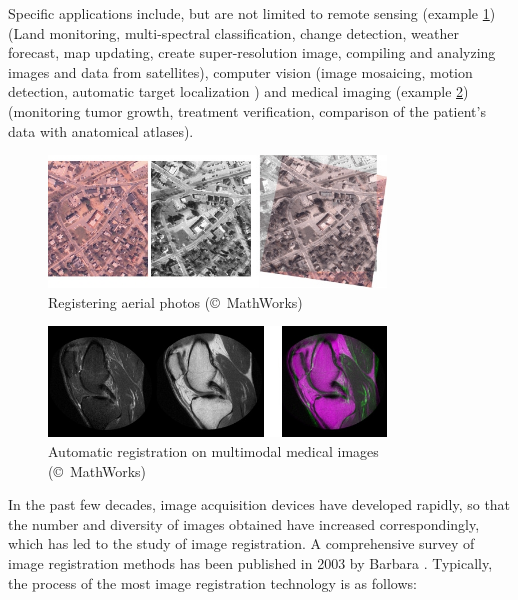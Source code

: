 Specific applications include, but are not limited to remote sensing (example \cref{fig:image registration example}) (Land monitoring, multi-spectral classification, change detection,  weather forecast, map updating, create super-resolution image, compiling and analyzing images and data from satellites), computer vision (image mosaicing, motion detection, automatic target localization )  and medical imaging (example \cref{fig:image registration example 2}) (monitoring tumor growth, treatment verification, comparison of the patient’s data with anatomical atlases).
\begin{figure}[htbp]
	\centering
	\includegraphics[width=0.80\textwidth]{images/Registering_aerial_photos}
	\caption{Registering aerial photos (\copyright\ MathWorks)}
	\label{fig:image registration example}
\end{figure}
\begin{figure}[htbp]
	\centering
	\includegraphics[width=0.80\textwidth]{images/medical_image}
	\caption{Automatic registration on multimodal medical images (\copyright\ MathWorks)}
	\label{fig:image registration example 2}
\end{figure}
In the past few decades, image acquisition devices have developed rapidly, so that the number and diversity of images obtained have increased correspondingly, which has led to the study of image registration. A comprehensive survey of image registration methods has been published in 2003 by Barbara \cite{zitovaImageRegistrationMethods2003}. Typically, the process of the most image registration technology is as follows: 
